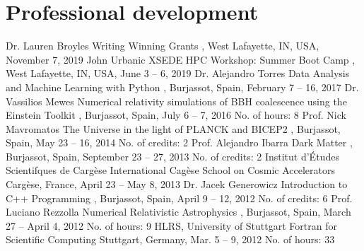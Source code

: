 \section{Professional development}

%
{Dr. Lauren Broyles}%
{Writing Winning Grants}%
{}%
{\Purdue, West Lafayette, IN, USA, November 7, 2019}%
{}
%
{John Urbanic}%
{XSEDE HPC Workshop: Summer Boot Camp}%
{}%
{\Purdue, West Lafayette, IN, USA, June 3 -- 6, 2019}%
{}
%
{Dr. Alejandro Torres}%
{Data Analysis and Machine Learning with Python}%
{}%
{\UVval, Burjassot, Spain, February 7 -- 16, 2017}%
{}
%
{Dr. Vassilios Mewes}%
{Numerical relativity simulations of BBH coalescence using the Einstein Toolkit}%
{}%
{\UVval, Burjassot, Spain, July 6 -- 7, 2016}%
{No. of hours: 8}
%
{Prof. Nick Mavromatos}%
{The Universe in the light of PLANCK and BICEP2}%
{}%
{\UVval, Burjassot, Spain, May 23 -- 16, 2014}%
{No. of credits: 2}
%
{Prof. Alejandro Ibarra}%
{Dark Matter}%
{}%
{\UVval, Burjassot, Spain, September 23 -- 27, 2013}
{No. of credits: 2}
%
{Institut d'Études Scientifques de Cargèse}%
{International Cagèse School on Cosmic Accelerators}%
{}%
{Cargèse, France, April 23 -- May 8, 2013}%
{}
%
{Dr. Jacek Generowicz}%
{Introduction to C++ Programming}%
{}%
{\UVval, Burjassot, Spain, April 9 -- 12, 2012}%
{No. of credits: 6}
%
{Prof. Luciano Rezzolla}%
{Numerical Relativistic Astrophysics}%
{}%
{\UVval, Burjassot, Spain, March 27 -- April 4, 2012}%
{No. of hours: 9}
%
{HLRS, University of Stuttgart}%
{Fortran for Scientific Computing}%
{}%
{Stuttgart, Germany, Mar. 5 -- 9, 2012}%
{No. of hours: 33}
